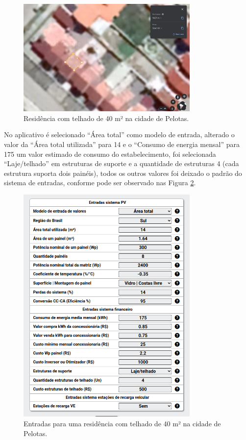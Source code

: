 \begin{figure}[H]
    \centering
    \includegraphics[width=0.8\textwidth]{./Figuras/casa_minha.png}
    \caption{Residência com telhado de 40 m² na cidade de Pelotas.}
   \label{fig:casa_minha}
\end{figure}

No aplicativo é selecionado ``Área total'' como modelo de entrada, alterado o valor da ``Área total utilizada'' para 14 e o ``Consumo de energia mensal'' para 175 um valor estimado de consumo do estabelecimento,  foi selecionada ``Laje/telhado'' em estruturas de suporte e a quantidade de estruturas 4 (cada estrutura suporta dois painéis), todos os outros valores foi deixado o padrão do sistema de entradas, conforme pode ser observado nas Figura \ref{fig:casa_minha_1}.

\begin{figure}[H]
    \centering
    \includegraphics[width=0.8\textwidth]{./Figuras/casa_minha_1.png}
    \caption{Entradas para uma residência com telhado de 40 m² na cidade de Pelotas.}
   \label{fig:casa_minha_1}
\end{figure}

